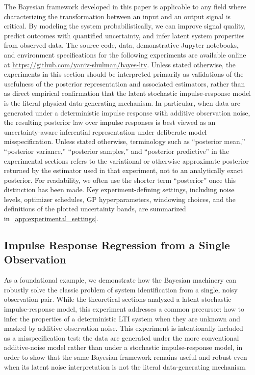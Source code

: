 \documentclass[preprint,1p,times,authoryear]{elsarticle}
\begin{document}
The Bayesian framework developed in this paper is applicable to any field where characterizing the transformation between an input and an output signal is critical. By modeling the system probabilistically, we can improve signal quality, predict outcomes with quantified uncertainty, and infer latent system properties from observed data. The source code, data, demonstrative Jupyter notebooks, and environment specifications for the following experiments are available online at \url{https://github.com/yaniv-shulman/bayes-ltv}. Unless stated otherwise, the experiments in this section should be interpreted primarily as validations of the usefulness of the posterior representation and associated estimators, rather than as direct empirical confirmation that the latent stochastic impulse-response model is the literal physical data-generating mechanism. In particular, when data are generated under a deterministic impulse response with additive observation noise, the resulting posterior law over impulse responses is best viewed as an uncertainty-aware inferential representation under deliberate model misspecification. Unless stated otherwise, terminology such as ``posterior mean,'' ``posterior variance,'' ``posterior samples,'' and ``posterior predictive'' in the experimental sections refers to the variational or otherwise approximate posterior returned by the estimator used in that experiment, not to an analytically exact posterior. For readability, we often use the shorter term ``posterior'' once this distinction has been made. Key experiment-defining settings, including noise levels, optimizer schedules, GP hyperparameters, windowing choices, and the definitions of the plotted uncertainty bands, are summarized in~\ref{app:experimental_settings}.


\subsection{Impulse Response Regression from a Single Observation}

As a foundational example, we demonstrate how the Bayesian machinery can robustly solve the classic problem of system identification from a single, noisy observation pair. While the theoretical sections analyzed a latent stochastic impulse-response model, this experiment addresses a common precursor: how to infer the properties of a deterministic LTI system when they are unknown and masked by additive observation noise. This experiment is intentionally included as a misspecification test: the data are generated under the more conventional additive-noise model rather than under a stochastic impulse-response model, in order to show that the same Bayesian framework remains useful and robust even when its latent noise interpretation is not the literal data-generating mechanism.
\end{document}
